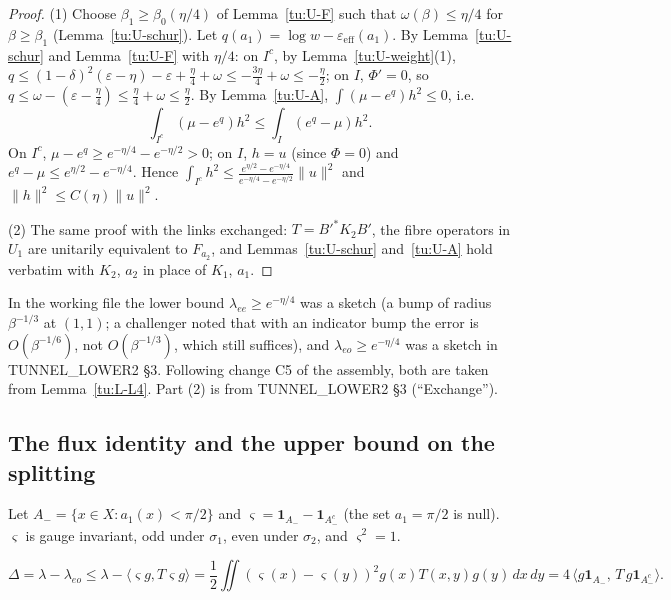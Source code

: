 \begin{proof}
(1) Choose $\beta_1\ge\beta_0(\eta/4)$ of Lemma~\ref{tu:U-F} such that $\omega(\beta)\le\eta/4$ for $\beta\ge\beta_1$
(Lemma~\ref{tu:U-schur}). Let $q(a_1)=\log w-\varepsilon_{\mathrm{eff}}(a_1)$. By Lemma~\ref{tu:U-schur} and
Lemma~\ref{tu:U-F} with $\eta/4$:
on $I^c$, by Lemma~\ref{tu:U-weight}(1), $q\le(1-\delta)^2(\varepsilon-\eta)-\varepsilon+\frac\eta4+\omega\le-\frac{3\eta}4+\omega\le-\frac\eta2$;
on $I$, $\Phi'=0$, so $q\le\omega-(\varepsilon-\frac\eta4)\le\frac\eta4+\omega\le\frac\eta2$.
By Lemma~\ref{tu:U-A}, $\int(\mu-e^{q})h^2\le0$, i.e.
\[
\int_{I^c}(\mu-e^q)h^2\le\int_I(e^q-\mu)h^2 .
\]
On $I^c$, $\mu-e^q\ge e^{-\eta/4}-e^{-\eta/2}>0$; on $I$, $h=u$ (since $\Phi=0$) and $e^q-\mu\le e^{\eta/2}-e^{-\eta/4}$. Hence
$\int_{I^c}h^2\le\frac{e^{\eta/2}-e^{-\eta/4}}{e^{-\eta/4}-e^{-\eta/2}}\|u\|^2$ and $\|h\|^2\le C(\eta)\|u\|^2$.

(2) The same proof with the links exchanged: $T=B'^*K_2B'$, the fibre operators in $U_1$ are unitarily equivalent
to $F_{a_2}$, and Lemmas~\ref{tu:U-schur} and~\ref{tu:U-A} hold verbatim with $K_2$, $a_2$ in place of $K_1$, $a_1$.
\end{proof}

\begin{remark}
In the working file the lower bound $\lambda_{ee}\ge e^{-\eta/4}$ was a sketch (a bump of radius $\beta^{-1/3}$ at
$(1,1)$; a challenger noted that with an indicator bump the error is $O(\beta^{-1/6})$, not $O(\beta^{-1/3})$, which still
suffices), and $\lambda_{eo}\ge e^{-\eta/4}$ was a sketch in TUNNEL\_LOWER2 \S3. Following change C5 of the assembly,
both are taken from Lemma~\ref{tu:L-L4}. Part (2) is from TUNNEL\_LOWER2 \S3 (``Exchange'').
\end{remark}

\subsection{The flux identity and the upper bound on the splitting}\label{tu:U-sec-flux}

Let $A_-=\{x\in X:a_1(x)<\pi/2\}$ and $\varsigma=\mathbf 1_{A_-}-\mathbf 1_{A_-^c}$ (the set $a_1=\pi/2$ is null). $\varsigma$ is gauge
invariant, odd under $\sigma_1$, even under $\sigma_2$, and $\varsigma^2=1$.

\begin{lemma}\label{tu:U-flux}
\[
\Delta=\lambda-\lambda_{eo}\le\lambda-\langle\varsigma g,T\varsigma g\rangle
=\frac12\iint(\varsigma(x)-\varsigma(y))^2g(x)T(x,y)g(y)\,dx\,dy=4\,\langle g\mathbf 1_{A_-},\,T\,g\mathbf 1_{A_-^c}\rangle .
\]
\end{lemma}

